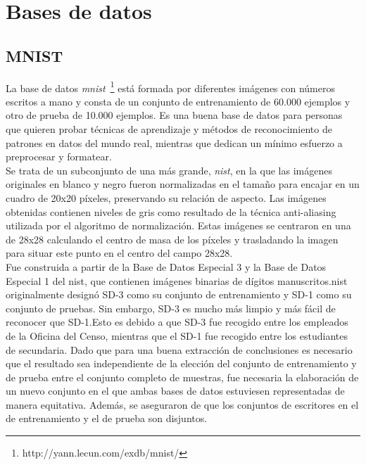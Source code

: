 \vspace{10pt}
\section{Bases de datos}

\subsection{MNIST}\label{sec.minst}
La base de datos \textit{\acrfull{mnist}}~\footnote{http://yann.lecun.com/exdb/mnist/} está formada por diferentes imágenes con números escritos a mano y consta de un conjunto de entrenamiento de 60.000 ejemplos y otro de prueba de 10.000 ejemplos. Es una buena base de datos para personas que quieren probar técnicas de aprendizaje y métodos de reconocimiento de patrones en datos del mundo real, mientras que dedican un mínimo esfuerzo a preprocesar y formatear. \\

Se trata de un subconjunto de una más grande, \textit{\acrfull{nist}}, en la que las imágenes originales en blanco y negro fueron normalizadas en el tamaño para encajar en un cuadro de 20x20 píxeles, preservando su relación de aspecto. Las imágenes obtenidas contienen niveles de gris como resultado de la técnica anti-aliasing utilizada por el algoritmo de normalización. Estas imágenes se centraron en una de 28x28 calculando el centro de masa de los píxeles y trasladando la imagen para situar este punto en el centro del campo 28x28.\\

Fue construida a partir de la Base de Datos Especial 3 y la Base de Datos Especial 1 del \acrshort{nist}, que contienen imágenes binarias de dígitos manuscritos.\acrshort{nist} originalmente designó SD-3 como su conjunto de entrenamiento y SD-1 como su conjunto de pruebas. Sin embargo, SD-3 es mucho más limpio y más fácil de reconocer que SD-1.Esto es debido a que SD-3 fue recogido entre los empleados de la Oficina del Censo, mientras que el SD-1 fue recogido entre los estudiantes de secundaria. Dado que para una buena extracción de conclusiones es necesario que el resultado sea independiente de la elección del conjunto de entrenamiento y de prueba entre el conjunto completo de muestras, fue necesaria la elaboración de un nuevo conjunto en el que ambas bases de datos estuviesen representadas de manera equitativa. Además, se aseguraron de que los conjuntos de escritores en el de entrenamiento y el de prueba son disjuntos.\\

